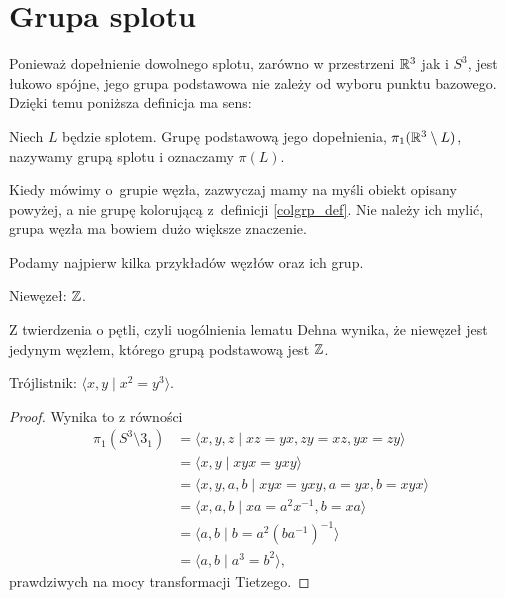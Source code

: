 \section{Grupa splotu}
\label{sec:group_wirtinger}

Ponieważ dopełnienie dowolnego splotu, zarówno w przestrzeni $\mathbb R^3$ jak i $S^3$, jest łukowo spójne, jego grupa podstawowa nie zależy od wyboru punktu bazowego.
Dzięki temu poniższa definicja ma sens:

\begin{definition}
    \label{def:knot_group}
    Niech $L$ będzie splotem.
    Grupę podstawową jego dopełnienia, $\pi_1(\mathbb R^3 \setminus L)$, nazywamy grupą splotu i oznaczamy $\pi(L)$.
\end{definition}

Kiedy mówimy o~grupie węzła, zazwyczaj mamy na myśli obiekt opisany powyżej, a nie grupę kolorującą z~definicji \ref{colgrp_def}.
Nie należy ich mylić, grupa węzła ma bowiem dużo większe znaczenie.

Podamy najpierw kilka przykładów węzłów oraz ich grup.

\begin{example}
    Niewęzeł: $\mathbb Z$.
\end{example}

Z twierdzenia o pętli, czyli uogólnienia lematu Dehna wynika, że niewęzeł jest jedynym węzłem, którego grupą podstawową jest $\mathbb Z$.

\begin{example}
    \label{exm:trefoil_group}
    Trójlistnik: $\langle x, y \mid x^2 = y^3\rangle$.
\end{example}

\begin{proof}
    Wynika to z równości
    \begin{align}
        \pi_1(S^3 \setminus 3_1) & = \langle x, y, z \mid xz = yx, zy = xz, yx = zy \rangle \\
                                 & = \langle x, y \mid xyx = yxy \rangle \\
                                 & = \langle x, y, a, b \mid xyx = yxy, a = yx, b = xyx \rangle \\
                                 & = \langle x, a, b \mid xa = a^2x^{-1}, b = xa \rangle \\
                                 & = \langle a, b \mid b = a^2(ba^{-1})^{-1} \rangle \\
                                 & = \langle a, b \mid a^3 = b^2 \rangle,
    \end{align}
    prawdziwych na mocy transformacji Tietzego.
\end{proof}

